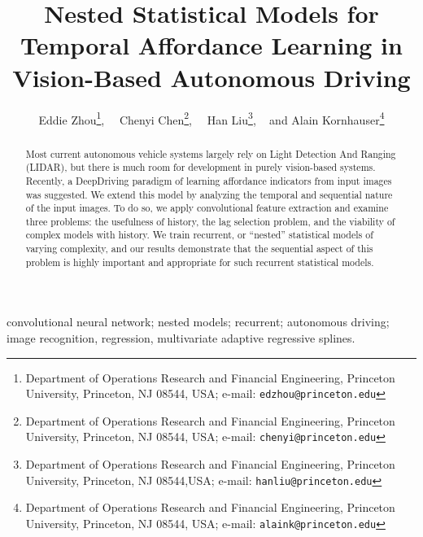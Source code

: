 \documentclass[master]{subfiles}
\begin{document}
\title{\huge Nested Statistical Models for Temporal Affordance Learning in Vision-Based Autonomous Driving}
\author{
Eddie Zhou\thanks{Department of Operations Research and Financial Engineering, Princeton University, Princeton, NJ 08544, USA; e-mail: {\tt edzhou@princeton.edu}},~~
Chenyi Chen\thanks{Department of Operations Research and Financial Engineering, Princeton University, Princeton, NJ 08544, USA; e-mail: {\tt chenyi@princeton.edu}},~~
Han Liu\thanks{Department of Operations Research and Financial Engineering, Princeton University, Princeton, NJ 08544,USA; e-mail: {\tt hanliu@princeton.edu}}, ~ and
Alain Kornhauser\thanks{Department of Operations Research and Financial Engineering, Princeton University, Princeton, NJ 08544, USA; e-mail: {\tt alaink@princeton.edu}}
}
\date{}
\maketitle
\thispagestyle{empty}
\begin{abstract}
Most current autonomous vehicle systems largely rely on Light Detection And Ranging (LIDAR), but there is much room for development in purely vision-based systems.  Recently, a DeepDriving paradigm of learning affordance indicators from input images was suggested.  We extend this model by analyzing the temporal and sequential nature of the input images.  To do so, we apply convolutional feature extraction and examine three problems: the usefulness of history, the lag selection problem, and the viability of complex models with history.  We train recurrent, or ``nested'' statistical models of varying complexity, and our results demonstrate that the sequential aspect of this problem is highly important and appropriate for such recurrent statistical models.
\end{abstract}
\vspace{1em}
 convolutional neural network; nested models; recurrent; autonomous driving; image recognition, regression, multivariate adaptive regressive splines.
\end{document}
